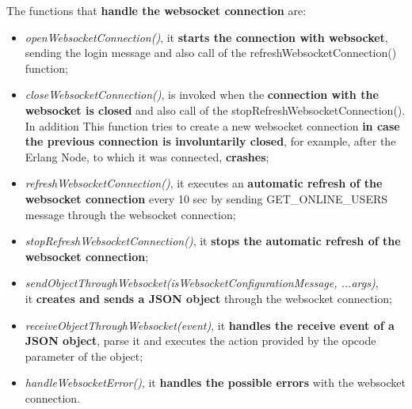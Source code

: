 The functions that \textbf{handle the websocket connection} are:
\begin{itemize}
    \item \textit{openWebsocketConnection()}, it \textbf{starts the connection with websocket}, sending the login message and also call of the refreshWebsocketConnection() function;
    \item  \textit{closeWebsocketConnection()}, is invoked when the \textbf{connection with the websocket is closed} and also call of the stopRefreshWebsocketConnection(). In addition This function tries to create a new websocket connection \textbf{in case the previous connection is involuntarily closed}, for example, after the Erlang Node, to which it was connected, \textbf{crashes};
    \item  \textit{refreshWebsocketConnection()}, it executes an \textbf{automatic refresh of the websocket connection} every 10 sec by sending GET\_ONLINE\_USERS message through the websocket connection;
    \item \textit{stopRefreshWebsocketConnection()}, it \textbf{stops the automatic refresh of the websocket connection};
    \item \textit{sendObjectThroughWebsocket(isWebsocketConfigurationMessage, ...args)},\\ it \textbf{creates and sends a JSON object} through the websocket connection;
    \item \textit{receiveObjectThroughWebsocket(event)}, it \textbf{handles the receive event of a JSON object}, parse it and executes the action provided by the opcode parameter of the object;
    \item \textit{handleWebsocketError()}, it \textbf{handles the possible errors} with the websocket connection.
\end{itemize}
